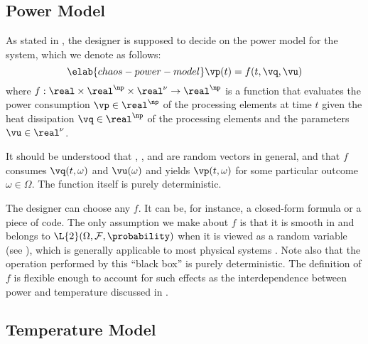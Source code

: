\subsection{Power Model}

As stated in , the designer is supposed to decide on the
power model for the system, which we denote as follows:
\begin{equation} \elab{chaos-power-model}
  \vp(t) = f(t, \vq, \vu)
\end{equation}
where $f: \real \times \real^\np \times \real^\nu \to \real^\np$ is a function
that evaluates the power consumption $\vp \in \real^\np$ of the processing
elements at time $t$ given the heat dissipation $\vq \in \real^\np$ of the
processing elements and the parameters $\vu \in \real^\nu$.

\begin{remark}
It should be understood that \vp, \vq, and \vu are random vectors in general,
and that $f$ consumes $\vq(t, \omega)$ and $\vu(\omega)$ and yields $\vp(t,
\omega)$ for some particular outcome $\omega \in \Omega$. The function itself is
purely deterministic.
\end{remark}

The designer can choose any $f$. It can be, for instance, a closed-form formula
or a piece of code. The only assumption we make about $f$ is that it is smooth
in \vz and belongs to $\L{2}(\Omega, \mathcal{F}, \probability)$ when it is
viewed as a random variable (see ), which is generally
applicable to most physical systems \cite{xiu2010}. Note also that the operation
performed by this ``black box'' is purely deterministic. The definition of $f$
is flexible enough to account for such effects as the interdependence between
power and temperature discussed in .

\subsection{Temperature Model}

